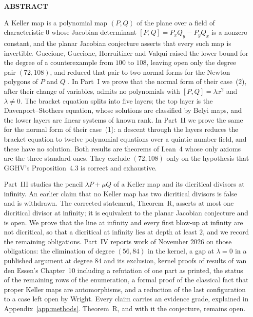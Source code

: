 \documentclass[a4paper,11pt]{article}
\renewenvironment{abstract}
  {\begin{jsabstractbox}{\small\bfseries\color{truetext}\MakeUppercase{Abstract}\par}\vspace{3pt}\small}
  {\end{jsabstractbox}}
\theoremstyle{jsplain}
\theoremstyle{jsdef}
\theoremstyle{jsrem}
\begin{document}
\begin{abstract}
A Keller map is a polynomial map $(P,Q)$ of the plane over a field of characteristic $0$ whose Jacobian determinant $[P,Q]=P_xQ_y-P_yQ_x$ is a nonzero constant, and the planar Jacobian conjecture asserts that every such map is invertible. Guccione, Guccione, Horruitiner and Valqui raised the lower bound for the degree of a counterexample from $100$ to $108$, leaving open only the degree pair $(72,108)$, and reduced that pair to two normal forms for the Newton polygons of $P$ and $Q$ \cite{GGHV}. In Part~I we prove that the normal form of their case~(2), after their change of variables, admits no polynomials with $[P,Q]=\lambda x^2$ and $\lambda\ne0$. The bracket equation splits into five layers; the top layer is the Davenport--Stothers equation, whose solutions are classified by Belyi maps, and the lower layers are linear systems of known rank. In Part~II we prove the same for the normal form of their case~(1): a descent through the layers reduces the bracket equation to twelve polynomial equations over a quintic number field, and these have no solution. Both results are theorems of Lean~4 whose only axioms are the three standard ones. They exclude $(72,108)$ only on the hypothesis that GGHV's Proposition~4.3 is correct and exhaustive.

Part~III studies the pencil $\lambda P+\mu Q$ of a Keller map and its dicritical divisors at infinity. An earlier claim that no Keller map has two dicritical divisors is false and is withdrawn. The corrected statement, Theorem~R, asserts at most one dicritical divisor at infinity; it is equivalent to the planar Jacobian conjecture and is open. We prove that the line at infinity and every first blow-up at infinity are not dicritical, so that a dicritical at infinity lies at depth at least $2$, and we record the remaining obligations. Part~IV reports work of November 2026 on those obligations: the elimination of degree $(56,84)$ in the kernel, a gap at $\lambda=0$ in a published argument at degree $84$ and its exclusion, kernel proofs of results of van den Essen's Chapter~10 including a refutation of one part as printed, the status of the remaining rows of the enumeration, a formal proof of the classical fact that proper Keller maps are automorphisms, and a reduction of the last configuration to a case left open by Wright. Every claim carries an evidence grade, explained in Appendix~\ref{app:methods}. Theorem~R, and with it the conjecture, remains open.
\end{abstract}
\end{document}
